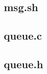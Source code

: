 \documentclass[a4paper, 12pt]{article}
\begin{document}
\subsection{msg.sh}\label{msg.sh}
\begin{scriptsize}
  
\end{scriptsize}

\subsection{queue.c}\label{queue.c}
\begin{scriptsize}
  
\end{scriptsize}

\subsection{queue.h}\label{queue.h}
\begin{scriptsize}
  
\end{scriptsize}
\end{document}
